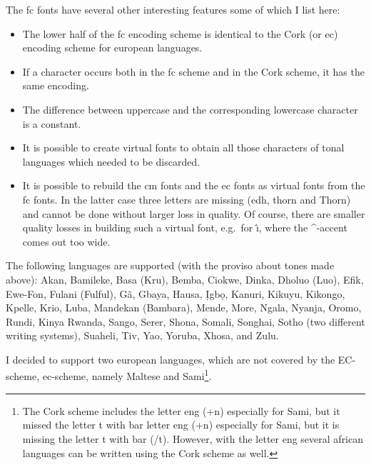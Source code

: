 {
\noindent
{}
The fc fonts have several other interesting features some of which I list 
here:
\begin{itemize}
\item The lower half of the fc encoding scheme is identical to the Cork 
      (or ec) encoding scheme for european languages.
\item If a character occurs both in the fc scheme and in the Cork scheme, 
      it has the same encoding.
\item The difference between uppercase and the corresponding 
      lowercase character is a constant.
\item It is possible to create virtual fonts to obtain all those 
      characters of tonal languages which needed to be discarded.
\item It is possible to rebuild the cm fonts and the ec fonts as virtual 
      fonts from the fc fonts. In the latter case three letters are missing
      (edh, thorn and Thorn) and cannot be done without larger loss in 
      quality. Of course, there are smaller quality losses in building 
      such a virtual font, e.g.~for \^\i, where the \^{}-accent comes out 
      too wide.
\end{itemize}

\noindent
{}
The following languages are supported (with the proviso about tones made 
above):   Akan, Bamileke, Basa (Kru), Bemba, Ciokwe, Dinka, Dholuo (Luo), Efik,
  Ewe-Fon, Fulani (Fulful), G\~a, Gbaya, Hausa, \d{I}gb\d{o}, Kanuri, Kikuyu, 
  Kikongo, Kpelle, Krio, Luba, Mandekan (Bambara), Mende, More, Ngala, 
  Nyanja, Oromo, Rundi, Kinya Rwanda, Sango, Serer, Shona, Somali, Songhai, 
  Sotho (two different writing systems), Suaheli, Tiv, Yao, Yoruba, Xhosa,
  and Zulu.

  I decided to support two european languages, which are not covered by the 
  EC-scheme,
%
  ec-scheme,
namely Maltese and Sami\footnote{The Cork scheme includes the
letter eng ({\fc+n}) especially for Sami, but it missed the letter t with bar
%
letter eng ({\fc+n}) especially for Sami, but it is missing
the letter t with bar
({\fc/t}). However, with the letter eng several african languages can be
written using the Cork scheme as well.}.

}
